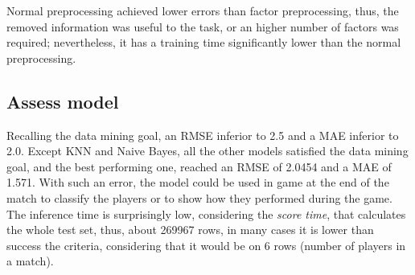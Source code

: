 Normal preprocessing achieved lower errors than factor preprocessing, thus, the removed information was useful to the task, or an higher number of factors was required; nevertheless, it has a training time significantly lower than the normal preprocessing. 



\subsection{Assess model}

Recalling the data mining goal, an RMSE inferior to 2.5 and a MAE inferior to 2.0. Except KNN and Naive Bayes, all the other models satisfied the data mining goal, and the best performing one, reached an RMSE of 2.0454 and a MAE of 1.571. With such an error, the model could be used in game at the end of the match to classify the players or to show how they performed during the game.
The inference time is surprisingly low, considering the \textit{score time}, that calculates the whole test set, thus, about 269967 rows, in many cases it is lower than success the criteria, considering that it would be on 6 rows (number of players in a match).